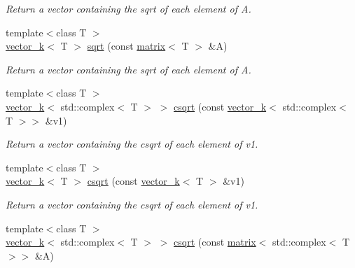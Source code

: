 \begin{DoxyCompactItemize}
\begin{DoxyCompactList}\small\item\em Return a vector containing the sqrt of each element of A. \end{DoxyCompactList}\item 
\hypertarget{namespacekeycpp_a9238ebdadb19806695736975e6dcdf4c}{{\footnotesize template$<$class T $>$ }\\\hyperlink{classkeycpp_1_1vector__k}{vector\-\_\-k}$<$ T $>$ \hyperlink{namespacekeycpp_a9238ebdadb19806695736975e6dcdf4c}{sqrt} (const \hyperlink{classkeycpp_1_1matrix}{matrix}$<$ T $>$ \&A)}\label{namespacekeycpp_a9238ebdadb19806695736975e6dcdf4c}

\begin{DoxyCompactList}\small\item\em Return a vector containing the sqrt of each element of A. \end{DoxyCompactList}\item 
\hypertarget{namespacekeycpp_a9642e67bdae5228a94fca58334c8f812}{{\footnotesize template$<$class T $>$ }\\\hyperlink{classkeycpp_1_1vector__k}{vector\-\_\-k}$<$ std\-::complex$<$ T $>$ $>$ \hyperlink{namespacekeycpp_a9642e67bdae5228a94fca58334c8f812}{csqrt} (const \hyperlink{classkeycpp_1_1vector__k}{vector\-\_\-k}$<$ std\-::complex$<$ T $>$$>$ \&v1)}\label{namespacekeycpp_a9642e67bdae5228a94fca58334c8f812}

\begin{DoxyCompactList}\small\item\em Return a vector containing the csqrt of each element of v1. \end{DoxyCompactList}\item 
\hypertarget{namespacekeycpp_ad5290a246f96df2efa1ffc0f80685478}{{\footnotesize template$<$class T $>$ }\\\hyperlink{classkeycpp_1_1vector__k}{vector\-\_\-k}$<$ T $>$ \hyperlink{namespacekeycpp_ad5290a246f96df2efa1ffc0f80685478}{csqrt} (const \hyperlink{classkeycpp_1_1vector__k}{vector\-\_\-k}$<$ T $>$ \&v1)}\label{namespacekeycpp_ad5290a246f96df2efa1ffc0f80685478}

\begin{DoxyCompactList}\small\item\em Return a vector containing the csqrt of each element of v1. \end{DoxyCompactList}\item 
\hypertarget{namespacekeycpp_af8482452959bd0ad0cee0e5704ae7851}{{\footnotesize template$<$class T $>$ }\\\hyperlink{classkeycpp_1_1vector__k}{vector\-\_\-k}$<$ std\-::complex$<$ T $>$ $>$ \hyperlink{namespacekeycpp_af8482452959bd0ad0cee0e5704ae7851}{csqrt} (const \hyperlink{classkeycpp_1_1matrix}{matrix}$<$ std\-::complex$<$ T $>$$>$ \&A)}\label{namespacekeycpp_af8482452959bd0ad0cee0e5704ae7851}


\end{DoxyCompactItemize}
